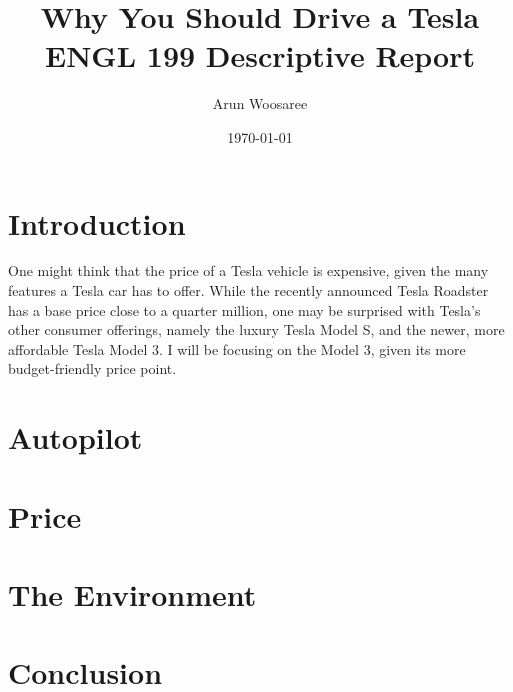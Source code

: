 \documentclass{article}
\title{Why You Should Drive a Tesla\\
\vspace{.25cm}\large ENGL 199 Descriptive Report \vspace{-.5cm}}
\author{\LARGE Arun Woosaree}
\date{\today}
\begin{document}
  \maketitle %

  \section{Introduction}
  One might think that the price of a Tesla vehicle is expensive, given the many
  features a Tesla car has to offer. While the recently announced Tesla Roadster
  has a base price  close to a quarter million\cite{teslaroadster}, one may be
  surprised with Tesla's other consumer offerings, namely the luxury Tesla Model S,
  and the newer, more affordable Tesla Model 3. I will be focusing on the Model 3,
  given its more budget-friendly price point.
  \newpage

  \section{Autopilot}
  \blindtext{}\blindtext{}

  \section{Price}
  \blindtext{}\blindtext{}

  \section{The Environment}
  \blindtext{}\blindtext{}

  \section{Conclusion}
  \blindtext{}\blindtext{}


\end{document}
